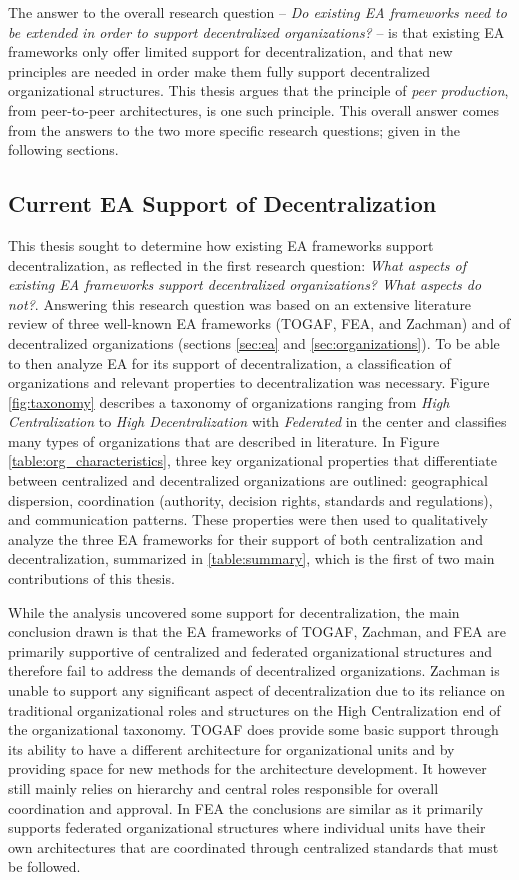 The answer to the overall research question -- \textit{Do existing EA frameworks need to be extended in order to support decentralized organizations?} -- is that existing EA frameworks only offer limited support for decentralization, and that new principles are needed in order make them fully support decentralized organizational structures. This thesis argues that the principle of \textit{peer production}, from peer-to-peer architectures, is one such principle. This overall answer comes from the answers to the two more specific research questions; given in the following sections.

\subsection{Current EA Support of Decentralization}

This thesis sought to determine how existing EA frameworks support decentralization, as reflected in the first research question: \textit{What aspects of existing EA frameworks support decentralized organizations? What aspects do not?}. Answering this research question was based on an extensive literature review of three well-known EA frameworks (TOGAF, FEA, and Zachman) and of decentralized organizations (sections \ref{sec:ea} and \ref{sec:organizations}). To be able to then analyze EA for its support of decentralization, a classification of organizations and relevant properties to decentralization was necessary. Figure \ref{fig:taxonomy} describes a taxonomy of organizations ranging from \textit{High Centralization} to \textit{High Decentralization} with \textit{Federated} in the center and classifies many types of organizations that are described in literature. In Figure \ref{table:org_characteristics}, three key organizational properties that differentiate between centralized and decentralized organizations are outlined: geographical dispersion, coordination (authority, decision rights, standards and regulations), and communication patterns. These properties were then used to qualitatively analyze the three EA frameworks for their support of both centralization and decentralization, summarized in \ref{table:summary}, which is the first of two main contributions of this thesis.

While the analysis uncovered some support for decentralization, the main conclusion drawn is that the EA frameworks of TOGAF, Zachman, and FEA are primarily supportive of centralized and federated organizational structures and therefore fail to address the demands of decentralized organizations. Zachman is unable to support any significant aspect of decentralization due to its reliance on traditional organizational roles and structures on the High Centralization end of the organizational taxonomy. TOGAF does provide some basic support through its ability to have a different architecture for organizational units and by providing space for new methods for the architecture development. It however still mainly relies on hierarchy and central roles responsible for overall coordination and approval. In FEA the conclusions are similar as it primarily supports federated organizational structures where individual units have their own architectures that are coordinated through centralized standards that must be followed.

